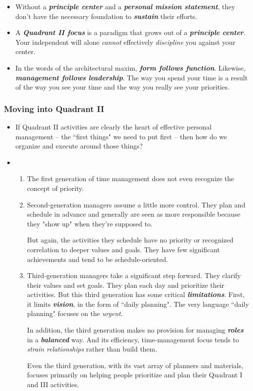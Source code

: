 \documentclass[11pt]{article}
\begin{document}
\begin{itemize}
\item Without a \emph{\textbf{principle center}} and a \emph{\textbf{personal mission statement}}, they don't have the necessary foundation to \emph{\textbf{sustain}} their efforts. 

\item A \emph{\textbf{Quadrant II focus}} is a paradigm that grows out of a \emph{\textbf{principle center}}. Your independent will alone \emph{cannot} effectively \emph{discipline} you against your center.

\item In the words of the architectural maxim, \emph{\textbf{form follows function}}. Likewise, \emph{\textbf{management follows leadership}}. The way you spend your time is a result of the way you see your time and the way you really see your priorities. 
\end{itemize}
\subsubsection{Moving into Quadrant II}
\begin{itemize}
\item If Quadrant II activities are clearly the heart of effective personal management -- the ``first things" we need to put first -- then how do we organize and execute around those things?

\item
 \begin{enumerate}
\item The first generation of time management does not even recognize the concept of priority. 
\item Second-generation managers assume a little more control. They plan and schedule in advance and generally are seen as more responsible because they "show up" when they're supposed to.

But again, the activities they schedule have no priority or recognized correlation to deeper values and goals. They have few significant achievements and tend to be schedule-oriented.

\item Third-generation managers take a significant step forward. They clarify their values and set goals. They plan each day and prioritize their activities. But this third generation has some critical \emph{\textbf{limitations}}. First, it limits \emph{\textbf{vision}}, in the form of ``daily planning". The very language  ``daily planning" focuses on the \emph{urgent}.

In addition, the third generation makes no provision for managing \emph{\textbf{roles}} in a \emph{\textbf{balanced}} way. And its efficiency, time-management
focus tends to \emph{strain relationships} rather than build them.

Even the third generation, with its vast array of planners and materials, focuses primarily on helping people prioritize and plan their Quadrant I and III activities.
\end{enumerate}
\end{itemize}
\end{document}
